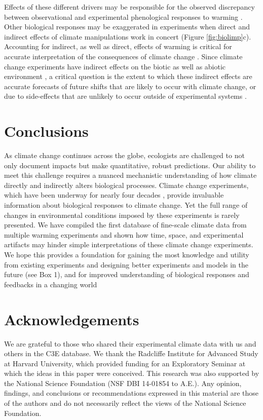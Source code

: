 \documentclass{article}
\begin{document}
Effects of these different drivers may be responsible for the observed discrepancy between observational and experimental phenological responses to warming \citep{wolkovich2012}. Other biological responses may be exaggerated in experiments when direct and indirect effects of climate manipulations work in concert (Figure \ref{fig:biolimp}c). Accounting for indirect, as well as direct, effects of warming is critical for accurate interpretation of the consequences of climate change \citep{kharouba2015}. Since climate change experiments have indirect effects on the biotic as well as abiotic environment \citep{hoeppner2012,pelini2014,diamond2016}, a critical question is the extent to which these indirect effects are accurate forecasts of future shifts that are likely to occur with climate change, or due to side-effects that are unlikely to occur outside of experimental systems \citep{moise2010,diamond2013}.
\section* {Conclusions}
\par As climate change continues across the globe, ecologists are challenged to not only document impacts but make quantitative, robust predictions. Our ability to meet this challenge requires a nuanced mechanistic understanding of how climate directly and indirectly alters biological processes. Climate change experiments, which have been underway for nearly four decades \citep[e.g.,][]{tamaki1981,carlson1982}, provide invaluable information about biological responses to climate change. Yet the full range of changes in environmental conditions imposed by these experiments is rarely presented. We have compiled the first database of fine-scale climate data from multiple warming experiments and shown how time, space, and experimental artifacts may hinder simple interpretations of these climate change experiments. We hope this provides a foundation for gaining the most knowledge and utility from existing experiments and designing better experiments and models in the future (see Box 1), and for improved understanding of biological responses and feedbacks in a changing world
 \section* {Acknowledgements}
We are grateful to those who shared their experimental climate data with us and others in the C3E database. We thank the Radcliffe Institute for Advanced Study at Harvard University, which provided funding for an Exploratory Seminar at which the ideas in this paper were conceived. This research was also supported by the National Science Foundation (NSF DBI 14-01854 to A.E.). Any opinion, findings, and conclusions or recommendations expressed in this material are those of the authors and do not necessarily reflect the views of the National Science Foundation.
\end{document}
